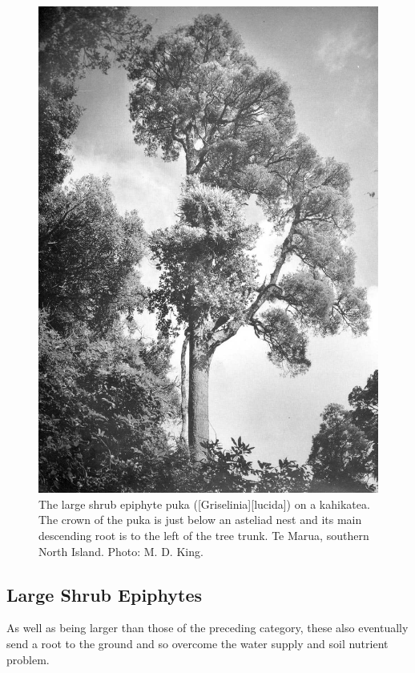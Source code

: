 \begin{figure}[htb]
\begin{minipage}[t]{0.493\textwidth}
    	\includegraphics[width=\textwidth]{graphics/figure45puka.jpg}
    	\caption[The large shrub epiphyte puka]{The large shrub epiphyte puka ([Griselinia][lucida]) on a kahikatea.
    	The crown of the puka is just below an asteliad nest and its main descending root is to the left of the tree trunk.
    	Te Marua, southern North Island.
    	Photo: M. D. King.}%
    	\label{fig:45puka}
	\end{minipage}
\end{figure}

\subsection{Large Shrub Epiphytes}

As well as being larger than those of the preceding category, these also eventually send a root to the ground and so overcome the water supply and soil nutrient problem.

